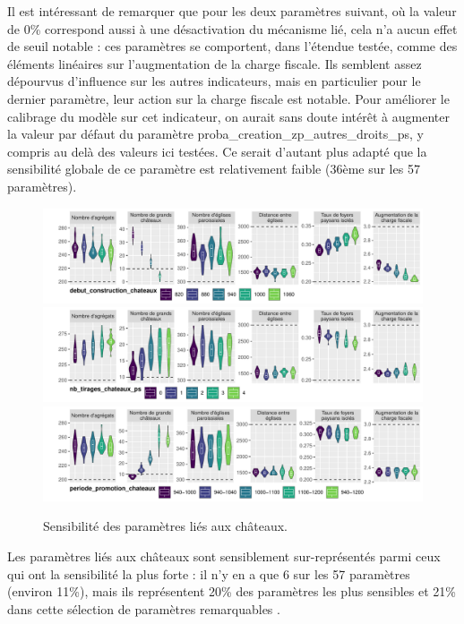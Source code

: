 Il est intéressant de remarquer que pour les deux paramètres suivant, où la valeur de 0\% correspond aussi à une désactivation du mécanisme lié, cela n'a aucun effet de seuil notable : ces paramètres se comportent, dans l'étendue testée, comme des éléments linéaires sur l'augmentation de la charge fiscale.
Ils semblent assez dépourvus d'influence sur les autres indicateurs, mais en particulier pour le dernier paramètre, leur action sur la charge fiscale est notable.
Pour améliorer le calibrage du modèle sur cet indicateur, on aurait sans doute intérêt à augmenter la valeur par défaut du paramètre \textsf{proba\_creation\_zp\_autres\_droits\_ps}, y compris au delà des valeurs ici testées.
Ce serait d'autant plus adapté que la sensibilité globale de ce paramètre est relativement faible (36ème sur les 57 paramètres).


\begin{figure}[H]
	\centering
	\includegraphics[width=\linewidth]{img/sensib/sensibilite_debut_construction_chateaux.pdf}
	\includegraphics[width=\linewidth]{img/sensib/sensibilite_nb_tirages_chateaux_ps.pdf}
	\includegraphics[width=\linewidth]{img/sensib/sensibilite_periode_promotion_chateaux.pdf}
	\caption{Sensibilité des paramètres liés aux châteaux.}
	\label{fig:sensib-chateaux}
\end{figure}

Les paramètres liés aux châteaux sont sensiblement sur-représentés parmi ceux qui ont la sensibilité la plus forte : il n'y en a que 6 sur les 57 paramètres (environ 11\%), mais ils représentent 20\% des paramètres les plus sensibles et 21\% dans cette sélection de paramètres remarquables .

